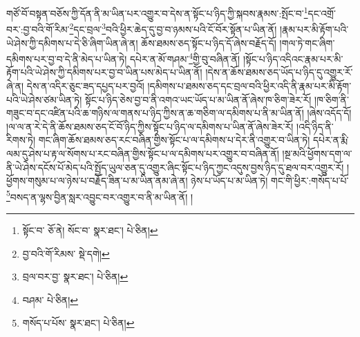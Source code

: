 གཙོ་བོ་བསྟན་བཅོས་ཀྱི་དོན་ནི་མ་ཡིན་པར་འགྱུར་བ་དེས་ན་སྟོང་པ་ཉིད་ཀྱི་སྐབས་རྣམས་:སྤོང་བ་\footnote{སྟོང་བ་  ཅོ་ནེ། སོང་བ་  སྣར་ཐང་།  པེ་ཅིན། }དང་འགྲོ་བར་:བྱ་བའི་གོ་རིམ་\footnote{བྱ་བའི་གོ་རིམས་  སྡེ་དགེ། }དང་བྲལ་\footnote{བྲལ་བར་བྱ་  སྣར་ཐང་།  པེ་ཅིན། }བའི་ཕྱིར་ཆེད་དུ་བྱ་བ་ཉམས་པའི་ངོ་བོར་སྟོན་པ་ཡིན་ནོ། །རྣམ་པར་མི་རྟོག་པའི་ཡེ་ཤེས་ཀྱི་དམིགས་པ་དེ་ཅི་ཞིག་ཡིན་ཞེ་ན། ཆོས་ཐམས་ཅད་སྟོང་པ་ཉིད་དོ་ཞེས་བརྗོད་དོ། །གལ་ཏེ་གང་ཞིག་དམིགས་པར་བྱ་བ་དེ་ནི་མེད་པ་ཡིན་ཏེ། དཔེར་ན་མོ་གཤམ་\footnote{བཤམ་  པེ་ཅིན། }གྱི་བུ་བཞིན་ནོ། །སྟོང་པ་ཉིད་འདིའང་རྣམ་པར་མི་རྟོག་པའི་ཡེ་ཤེས་ཀྱི་དམིགས་པར་བྱ་བ་ཡིན་པས་མེད་པ་ཡིན་ནོ། །དེས་ན་ཆོས་ཐམས་ཅད་ཡོད་པ་ཉིད་དུ་འགྱུར་རོ་ཞེ་ན། དེས་ན་འདིར་ཅུང་ཟད་དཔྱད་པར་བྱའོ། །དམིགས་པ་ཐམས་ཅད་དང་བྲལ་བའི་ཕྱིར་འདི་ནི་རྣམ་པར་མི་རྟོག་པའི་ཡེ་ཤེས་ཙམ་ཡིན་ཏེ། སྟོང་པ་ཉིད་ཅེས་བྱ་བ་ནི་འགའ་ཡང་ཡོད་པ་མ་ཡིན་ནོ་ཞེས་ཁ་ཅིག་ཟེར་རོ། །ཁ་ཅིག་ནི་གཟུང་བ་དང་འཛིན་པའི་ཆ་གཉིས་ལ་གནས་པ་ཉིད་ཀྱིས་ན་ཆ་གཅིག་ལ་དམིགས་པ་ནི་མ་ཡིན་ནོ། །ཞེས་འདོད་དོ། །ལ་ལ་ན་རེ་དེ་ནི་ཆོས་ཐམས་ཅད་ངོ་བོ་ཉིད་ཀྱིས་སྟོང་པ་ཉིད་ལ་དམིགས་པ་ཡིན་ནོ་ཞེས་ཟེར་རོ། །འདི་ཉིད་ནི་རིགས་ཏེ། གང་ཞིག་ཆོས་ཐམས་ཅད་རང་བཞིན་གྱིས་སྟོང་པ་ལ་དམིགས་པ་དེར་ནི་འགྱུར་བ་ཡིན་ཏེ། དཔེར་ན་རྨི་ལམ་དུ་ཤེས་པ་རྟ་ལ་སོགས་པ་རང་བཞིན་གྱིས་སྟོང་པ་ལ་དམིགས་པར་འགྱུར་བ་བཞིན་ནོ། །སྔ་མའི་ཕྱོགས་དག་ལ་ནི་ཡེ་ཤེས་དངོས་པོ་མེད་པའི་སྤྱོད་ཡུལ་ཅན་དུ་འགྱུར་ཞིང་སྟོང་པ་ཉིད་ཀྱང་འདུས་བྱས་ཉིད་དུ་ཐལ་བར་འགྱུར་རོ། །ཕྱོགས་གསུམ་པ་ལ་ཉེས་པ་བརྗོད་ཟིན་པ་མ་ཡིན་ནམ་ཞེ་ན། ཉེས་པ་ཡོད་པ་མ་ཡིན་ཏེ། གང་གི་ཕྱིར་:གསོད་པ་པོ་\footnote{གསོད་པ་པོས་  སྣར་ཐང་།  པེ་ཅིན། }བསད་ན་ལྷས་བྱིན་སླར་འབྱུང་བར་འགྱུར་བ་ནི་མ་ཡིན་ནོ། །
